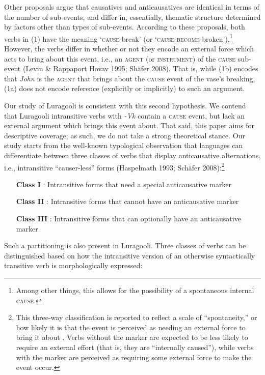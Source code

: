 \documentclass[output=paper]{langsci/langscibook}
\begin{document}
Other proposals argue that causatives and anticausatives are identical in terms of the number of sub-events, and differ in, essentially, thematic structure determined by factors other than types of sub-events. According to these proposals, both verbs in (1) have the meaning ‘\textsc{cause}-break’ (or ‘\textsc{cause-become}-broken’).\footnote{ Among other things, this allows for the possibility of a spontaneous internal \textsc{cause.}} However, the verbs differ in whether or not they encode an external force which acts to bring about this event, i.e., an \textsc{agent (}or \textsc{instrument}) of the \textsc{cause} sub-event (Levin \& Rappaport Hovav 1995; Shäfer 2008). That is, while (1b) encodes that \textit{John }is the\textsc{ agent} that brings about the \textsc{cause} event of the vase’s breaking, (1a) does not encode reference (explicitly or implicitly) to such an argument. 

  Our study of Luragooli is consistent with this second hypothesis. We contend that Luragooli intransitive verbs with \textit{-Vk} contain a \textsc{cause} event, but lack an external argument which brings this event about. That said, this paper aims for descriptive coverage; as such, we do not take a strong theoretical stance. Our study starts from the well-known typological observation that languages can differentiate between three classes of verbs that display anticausative alternations, i.e., intransitive “causer-less” forms (Haspelmath 1993; Schäfer 2008):\footnote{ This three-way classification is reported to reflect a scale of “spontaneity,” or how likely it is that the event is perceived as needing an external force to bring it about \citep{Haspelmath1993}. Verbs without the marker are expected to be less likely to require an external effort (that is, they are “internally caused”), while verbs with the marker are perceived as requiring some external force to make the event occur. }
\begin{itemize}
     \item[\textbf{  Class I}]: Intransitive forms that need a special anticausative marker\
     \item[\textbf{  Class II}]: Intransitive forms that cannot have an anticausative marker\\
     \item[\textbf{  Class III}]: Intransitive forms that can optionally have an anticausative marker\\ 
\end{itemize}

     
Such a partitioning is also present in Luragooli. Three classes of verbs can be distinguished based on how the intransitive version of an otherwise syntactically transitive verb is morphologically expressed:
\end{document}

